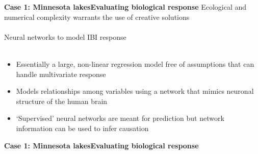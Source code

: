 \documentclass[serif]{beamer}\usepackage[]{graphicx}\usepackage[]{color}
\begin{document}
\begin{frame}{\textbf{Case 1: Minnesota lakes}}{\textbf{Evaluating biological response}}
\onslide<+->
Ecological and numerical complexity warrants the use of creative solutions\\~\\
Neural networks to model IBI response\\~\\
\begin{itemize}
\onslide<+->
\item{Essentially a large, non-linear regression model free of assumptions that can handle multivariate response}
\onslide<+->
\item{Models relationships among variables using a network that mimics neuronal structure of the human brain}
\onslide<+->
\item{`Supervised' neural networks are meant for prediction but network information can be used to infer causation}
\end{itemize}
\end{frame}

\begin{frame}{\textbf{Case 1: Minnesota lakes}}{\textbf{Evaluating biological response}}
\begin{center}
\end{center}
\end{frame}
\end{document}
